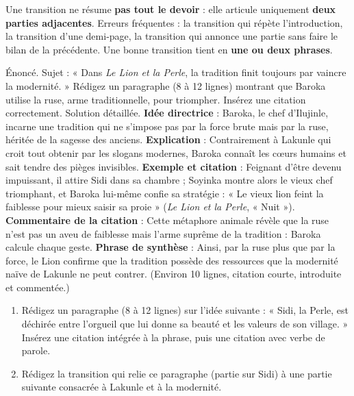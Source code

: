 \documentclass[11pt]{article}
\newcounter{popsec}
\newcounter{popsub}
\newcommand{\courssub}[1]{%
  \stepcounter{popsub}%
  \par\vspace{9pt}\noindent{\popxbold\fontsize{11.5}{13}\selectfont\color{popink}{\color{poporange}\thepopsec.\thepopsub}\hspace{6pt}#1}\par\nopagebreak\vspace{4pt}
}
\begin{document}
\begin{attention}
Une transition ne résume \textbf{pas tout le devoir} : elle articule uniquement \textbf{deux parties adjacentes}. Erreurs fréquentes : la transition qui répète l'introduction, la transition d'une demi-page, la transition qui annonce une partie sans faire le bilan de la précédente. Une bonne transition tient en \textbf{une ou deux phrases}.
\end{attention}

\courssub{Exercice résolu et ateliers de production}

\begin{exoresolu}
Énoncé. Sujet : « Dans \emph{Le Lion et la Perle}, la tradition finit toujours par vaincre la modernité. » Rédigez un paragraphe (8 à 12 lignes) montrant que Baroka utilise la ruse, arme traditionnelle, pour triompher. Insérez une citation correctement.
\tcblower
Solution détaillée. \textbf{Idée directrice} : Baroka, le chef d'Ilujinle, incarne une tradition qui ne s'impose pas par la force brute mais par la ruse, héritée de la sagesse des anciens. \textbf{Explication} : Contrairement à Lakunle qui croit tout obtenir par les slogans modernes, Baroka connaît les cœurs humains et sait tendre des pièges invisibles. \textbf{Exemple et citation} : Feignant d'être devenu impuissant, il attire Sidi dans sa chambre ; Soyinka montre alors le vieux chef triomphant, et Baroka lui-même confie sa stratégie : « Le vieux lion feint la faiblesse pour mieux saisir sa proie » (\emph{Le Lion et la Perle}, « Nuit »). \textbf{Commentaire de la citation} : Cette métaphore animale révèle que la ruse n'est pas un aveu de faiblesse mais l'arme suprême de la tradition : Baroka calcule chaque geste. \textbf{Phrase de synthèse} : Ainsi, par la ruse plus que par la force, le Lion confirme que la tradition possède des ressources que la modernité naïve de Lakunle ne peut contrer. (Environ 10 lignes, citation courte, introduite et commentée.)
\end{exoresolu}

\begin{exercice}
\begin{enumerate}
\item Rédigez un paragraphe (8 à 12 lignes) sur l'idée suivante : « Sidi, la Perle, est déchirée entre l'orgueil que lui donne sa beauté et les valeurs de son village. » Insérez une citation intégrée à la phrase, puis une citation avec verbe de parole.
\item Rédigez la transition qui relie ce paragraphe (partie sur Sidi) à une partie suivante consacrée à Lakunle et à la modernité.
\end{enumerate}
\end{exercice}
\end{document}
